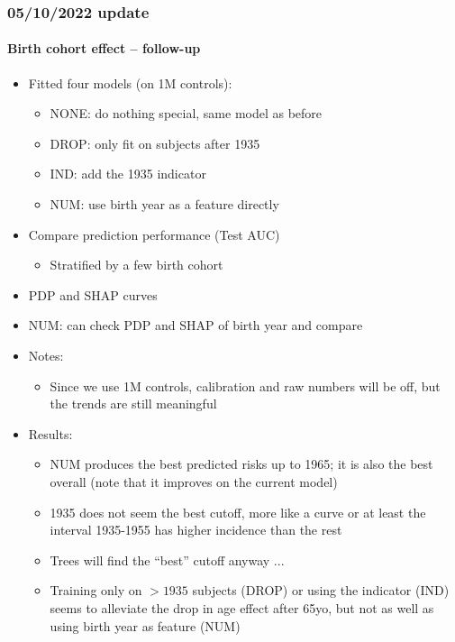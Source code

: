 \documentclass[12pt]{article}
\begin{document}
\clearpage
\pagebreak
\subsubsection*{05/10/2022 update}

\paragraph*{Birth cohort effect -- follow-up}

\begin{itemize}
	\item Fitted four models (on 1M controls):
	\begin{itemize}
		\item NONE: do nothing special, same model as before
		\item DROP: only fit on subjects after 1935
		\item IND: add the 1935 indicator
		\item NUM: use birth year as a feature directly
	\end{itemize}
	\item Compare prediction performance (Test AUC)
	\begin{itemize}
		\item Stratified by a few birth cohort
	\end{itemize}
	\item PDP and SHAP curves
	\item NUM: can check PDP and SHAP of birth year and compare
	\item Notes: 
	\begin{itemize}
		\item Since we use 1M controls, calibration and raw numbers will be off, 
		but the trends are still meaningful
	\end{itemize}
	\item Results:
	\begin{itemize}
		\item NUM produces the best predicted risks up to 1965; it is
		also the best overall (note that it improves on the current model)
		\item 1935 does not seem the best cutoff, more like a curve or at least the
		interval 1935-1955 has higher incidence than the rest
		\item Trees will find the ``best'' cutoff anyway ...
		\item Training only on $>1935$ subjects (DROP) or using the indicator (IND)
		 seems to alleviate the drop in age effect after 65yo, but not as well
		 as using birth year as feature (NUM)
	\end{itemize}
\end{itemize}
\end{document}
